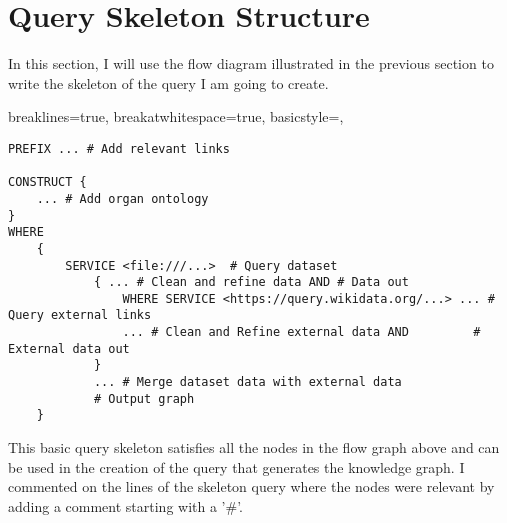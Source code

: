 \section{Query Skeleton Structure}
\hspace{0.5cm} In this section, I will use the flow diagram illustrated in the previous section to write the skeleton of the query I am going to create.

\lstset
{
    breaklines=true,
    breakatwhitespace=true,
    basicstyle=\ttfamily,
}
\begin{lstlisting}
PREFIX ... # Add relevant links

CONSTRUCT {
    ... # Add organ ontology
} 
WHERE 
    { 
        SERVICE <file:///...>  # Query dataset
            { ... # Clean and refine data AND # Data out
                WHERE SERVICE <https://query.wikidata.org/...> ... # Query external links
                ... # Clean and Refine external data AND         # External data out
            }
            ... # Merge dataset data with external data
            # Output graph
    }

\end{lstlisting}

This basic query skeleton satisfies all the nodes in the flow graph above and can be used in the creation of the query that generates the knowledge graph. I commented on the lines of the skeleton query where the nodes were relevant by adding a comment starting with a '\#'. 
